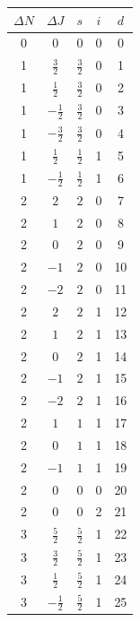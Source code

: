 \documentclass{article}
\begin{document}
       \begin{tabular}{|c|c|c|c|c|}
       \hline
           $\Delta N$ &$\Delta J$& $s$ &$i$&$d$ \\ \hline
           0 & 0& 0&0&0 \\\hline
           1 & $\frac{3}{2}$& $\frac{3}{2}$&0&1 \\\hline
           1 & $\frac{1}{2}$& $\frac{3}{2}$&0&2 \\\hline
           1 & $-\frac{1}{2}$& $\frac{3}{2}$&0&3 \\\hline
           1 & $-\frac{3}{2}$& $\frac{3}{2}$&0&4 \\\hline           
           1 & $\frac{1}{2}$& $\frac{1}{2}$&1&5 \\\hline               
           1 & $-\frac{1}{2}$& $\frac{1}{2}$&1&6 \\\hline            
           2 & $2$& $2$&0&7 \\\hline            
           2 & $1$& $2$&0&8 \\\hline            
           2 & $0$& $2$&0&9 \\\hline            
           2 & $-1$& $2$&0&10 \\\hline            
           2 & $-2$& $2$&0&11 \\\hline            
           2 & $2$& $2$&1&12 \\\hline            
           2 & $1$& $2$&1&13 \\\hline            
           2 & $0$& $2$&1&14 \\\hline            
           2 & $-1$& $2$&1&15 \\\hline            
           2 & $-2$& $2$&1&16 \\\hline           
           2 & $1$& $1$&1&17 \\\hline         
           2 & $0$& $1$&1&18 \\\hline         
           2 & $-1$& $1$&1&19 \\\hline         
           2 & $0$& $0$&0&20 \\\hline        
           2 & $0$& $0$&2&21 \\\hline        
           3 & $\frac{5}{2}$& $\frac{5}{2}$&1&22 \\\hline       
           3 & $\frac{3}{2}$& $\frac{5}{2}$&1&23 \\\hline       
           3 & $\frac{1}{2}$& $\frac{5}{2}$&1&24 \\\hline       
           3 & $-\frac{1}{2}$& $\frac{5}{2}$&1&25 \\\hline       

\end{tabular}
\end{document}
